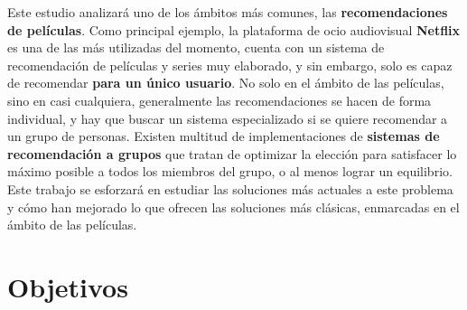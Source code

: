 Este estudio analizará uno de los ámbitos más comunes, las \textbf{recomendaciones de películas}. Como principal ejemplo, la plataforma de ocio audiovisual \textbf{Netflix} es una de las más utilizadas del momento, cuenta con un sistema de recomendación de películas y series muy elaborado, y sin embargo, solo es capaz de recomendar \textbf{para un único usuario}. No solo en el ámbito de las películas, sino en casi cualquiera, generalmente las recomendaciones se hacen de forma individual, y hay que buscar un sistema especializado si se quiere recomendar a un grupo de personas. Existen multitud de implementaciones de \textbf{sistemas de recomendación a grupos} que tratan de optimizar la elección para satisfacer lo máximo posible a todos los miembros del grupo, o al menos lograr un equilibrio. Este trabajo se esforzará en estudiar las soluciones más actuales a este problema y cómo han mejorado lo que ofrecen las soluciones más clásicas, enmarcadas en el ámbito de las películas.

\section{Objetivos}

